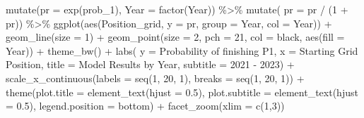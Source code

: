 \documentclass[
]{book}
\newenvironment{Shaded}{\begin{snugshade}}{\end{snugshade}}
\newcommand{\AttributeTok}[1]{\textcolor[rgb]{0.77,0.63,0.00}{#1}}
\newcommand{\DecValTok}[1]{\textcolor[rgb]{0.00,0.00,0.81}{#1}}
\newcommand{\FloatTok}[1]{\textcolor[rgb]{0.00,0.00,0.81}{#1}}
\newcommand{\FunctionTok}[1]{\textcolor[rgb]{0.00,0.00,0.00}{#1}}
\newcommand{\NormalTok}[1]{#1}
\newcommand{\SpecialCharTok}[1]{\textcolor[rgb]{0.00,0.00,0.00}{#1}}
\newcommand{\StringTok}[1]{\textcolor[rgb]{0.31,0.60,0.02}{#1}}
\begin{document}
\begin{Shaded}
\begin{Highlighting}[]
  \FunctionTok{mutate}\NormalTok{(}\AttributeTok{pr =} \FunctionTok{exp}\NormalTok{(prob\_1),}
         \AttributeTok{Year =} \FunctionTok{factor}\NormalTok{(Year)) }\SpecialCharTok{\%\textgreater{}\%} 
  \FunctionTok{mutate}\NormalTok{( }\AttributeTok{pr =}\NormalTok{ pr }\SpecialCharTok{/}\NormalTok{ (}\DecValTok{1} \SpecialCharTok{+}\NormalTok{ pr)) }\SpecialCharTok{\%\textgreater{}\%} 
  \FunctionTok{ggplot}\NormalTok{(}\FunctionTok{aes}\NormalTok{(Position\_grid, }\AttributeTok{y =}\NormalTok{ pr, }\AttributeTok{group  =}\NormalTok{ Year, }\AttributeTok{col =}\NormalTok{ Year)) }\SpecialCharTok{+}
  \FunctionTok{geom\_line}\NormalTok{(}\AttributeTok{size =} \DecValTok{1}\NormalTok{) }\SpecialCharTok{+} 
  \FunctionTok{geom\_point}\NormalTok{(}\AttributeTok{size =} \DecValTok{2}\NormalTok{, }\AttributeTok{pch =} \DecValTok{21}\NormalTok{, }\AttributeTok{col =} \StringTok{\textquotesingle{}black\textquotesingle{}}\NormalTok{, }\FunctionTok{aes}\NormalTok{(}\AttributeTok{fill =}\NormalTok{ Year)) }\SpecialCharTok{+}
  \FunctionTok{theme\_bw}\NormalTok{() }\SpecialCharTok{+}
  \FunctionTok{labs}\NormalTok{( }\AttributeTok{y =} \StringTok{\textquotesingle{}Probability of finishing P1\textquotesingle{}}\NormalTok{,}
        \AttributeTok{x =} \StringTok{\textquotesingle{}Starting Grid Position\textquotesingle{}}\NormalTok{,}
        \AttributeTok{title =} \StringTok{\textquotesingle{}Model Results by Year\textquotesingle{}}\NormalTok{,}
        \AttributeTok{subtitle =} \StringTok{\textquotesingle{}2021 {-} 2023\textquotesingle{}}\NormalTok{) }\SpecialCharTok{+}
  \FunctionTok{scale\_x\_continuous}\NormalTok{(}\AttributeTok{labels =} \FunctionTok{seq}\NormalTok{(}\DecValTok{1}\NormalTok{, }\DecValTok{20}\NormalTok{, }\DecValTok{1}\NormalTok{),}
                     \AttributeTok{breaks =} \FunctionTok{seq}\NormalTok{(}\DecValTok{1}\NormalTok{, }\DecValTok{20}\NormalTok{, }\DecValTok{1}\NormalTok{)) }\SpecialCharTok{+}
  \FunctionTok{theme}\NormalTok{(}\AttributeTok{plot.title =} \FunctionTok{element\_text}\NormalTok{(}\AttributeTok{hjust =} \FloatTok{0.5}\NormalTok{),}
        \AttributeTok{plot.subtitle =} \FunctionTok{element\_text}\NormalTok{(}\AttributeTok{hjust =} \FloatTok{0.5}\NormalTok{),}
        \AttributeTok{legend.position =} \StringTok{\textquotesingle{}bottom\textquotesingle{}}\NormalTok{) }\SpecialCharTok{+}
  \FunctionTok{facet\_zoom}\NormalTok{(}\AttributeTok{xlim =} \FunctionTok{c}\NormalTok{(}\DecValTok{1}\NormalTok{,}\DecValTok{3}\NormalTok{))}
\end{Highlighting}
\end{Shaded}
\end{document}
